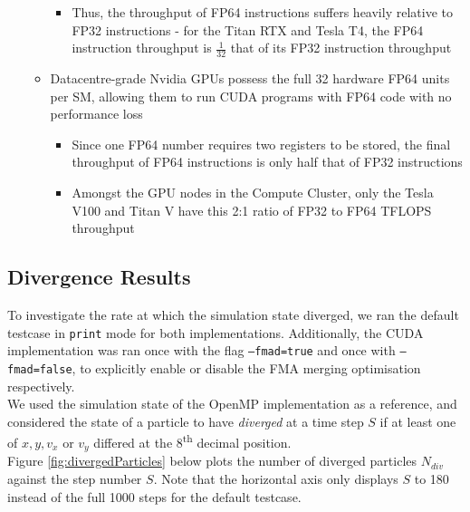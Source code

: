 \documentclass[12pt]{article}
\begin{document}
\begin{enumerate}
\begin{itemize}
\begin{itemize}
            \item Thus, the throughput of FP64 instructions suffers heavily relative to FP32 instructions - for the Titan RTX and Tesla T4, the FP64 instruction throughput is $\frac{1}{32}$ that of its FP32 instruction throughput
        \end{itemize}
        \item Datacentre-grade Nvidia GPUs possess the full 32 hardware FP64 units per SM, allowing them to run CUDA programs with FP64 code with no performance loss
        \begin{itemize}
            \item Since one FP64 number requires two registers to be stored, the final throughput of FP64 instructions is only half that of FP32 instructions
            \item Amongst the GPU nodes in the Compute Cluster, only the Tesla V100 and Titan V have this 2:1 ratio of FP32 to FP64 TFLOPS throughput
        \end{itemize}
    \end{itemize}
\end{enumerate}

\subsection{Divergence Results}
To investigate the rate at which the simulation state diverged, we ran the default testcase in \texttt{print} mode for both implementations. Additionally, the CUDA implementation was ran once with the flag \texttt{--fmad=true} and once with \texttt{--fmad=false}, to explicitly enable or disable the FMA merging optimisation respectively.\\

We used the simulation state of the OpenMP implementation as a reference, and considered the state of a particle to have \textit{diverged} at a time step $S$ if at least one of $x, y, v_x$ or $v_y$ differed at the 8\textsuperscript{th} decimal position.\\

Figure \ref{fig:divergedParticles} below plots the number of diverged particles $N_{div}$ against the step number $S$. Note that the horizontal axis only displays $S$ to 180 instead of the full 1000 steps for the default testcase.\\
\end{document}

